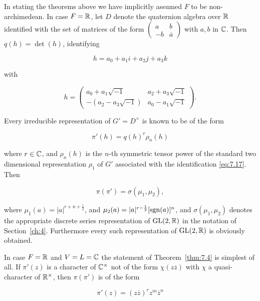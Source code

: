 \begin{remark}\label{rem:7.7}

In stating the theorems above we have implicitly assumed $F$ to be non-archimedean. In case $F = \mathbb{R}$, let $D$ denote the quaternion algebra over $\mathbb{R}$ identified with the set of matrices of the form $\begin{pmatrix} a & b \\ -b & \overline{a} \end{pmatrix}$ with $a, b$ in $\mathbb{C}$. Then $q(h) = \det(h)$, identifying

\[
h = a_0 + a_1i + a_2j + a_3k
\]

with

\begin{equation}\label{eq:7.17}
h = \begin{pmatrix} a_0 + a_1\sqrt{-1} & a_2 + a_3\sqrt{-1} \\ -(a_2 - a_3\sqrt{-1}) & a_0 - a_1\sqrt{-1} \end{pmatrix}.\tag{7.17}
\end{equation}

Every irreducible representation of $G' = D^{\times}$ is known to be of the form

\begin{equation}\label{eq:7.18}
\pi'(h) = q(h)^{r}\rho_n(h)\tag{7.18}
\end{equation}

where $r \in \mathbb{C}$, and $\rho_n(h)$ is the $n$-th symmetric tensor power of the standard two dimensional representation $\rho_1$ of $G'$ associated with the identification \eqref{eq:7.17}. Then

\begin{equation}\label{eq:7.19}
\pi(\pi') = \sigma(\mu_1, \mu_2),\tag{7.19}
\end{equation}

where $\mu_1(a) = |a|^{r + n + \frac{1}{2}}$, and $\mu_2(a) = |a|^{r - \frac{1}{2}}[\operatorname{sgn}(a)]^{n}$, and $\sigma(\mu_1, \mu_2)$ denotes the appropriate discrete series representation of $\operatorname{GL}(2,\mathbb{R})$ in the notation of Section~\ref{ch:4}. Furthermore every such representation of $\operatorname{GL}(2,\mathbb{R})$ is obviously obtained.

In case $F = \mathbb{R}$ and $V = L = \mathbb{C}$ the statement of Theorem~\ref{thm:7.4} is simplest of all. If $\pi'(z)$ is a character of $\mathbb{C}^{\times}$ not of the form $\chi(z\overline{z})$ with $\chi$ a quasi-character of $\mathbb{R}^{\times}$, then $\pi(\pi')$ is of the form

\begin{equation}\label{eq:7.20}
\pi'(z) = (z\overline{z})^{r}z^{m}\overline{z}^{n}\tag{7.20}
\end{equation}


\end{remark}
